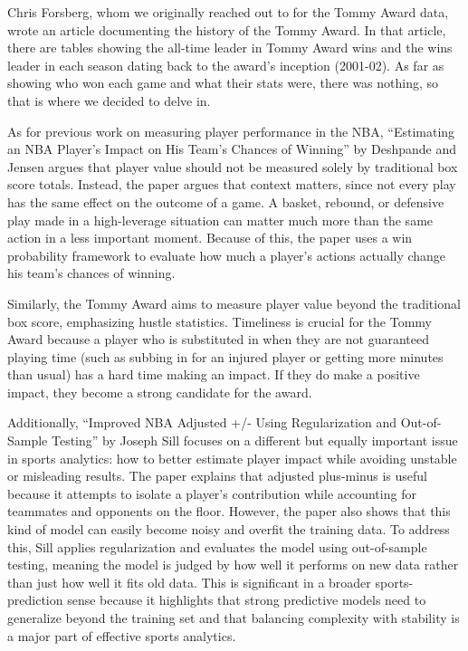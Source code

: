 \documentclass[11pt]{article}
\begin{document}
Chris Forsberg, whom we originally reached out to for the Tommy Award data, wrote an article documenting the history of the Tommy Award. In that article, there are tables showing the all-time leader in Tommy Award wins and the wins leader in each season dating back to the award's inception (2001-02). As far as showing who won each game and what their stats were, there was nothing, so that is where we decided to delve in.

As for previous work on measuring player performance in the NBA, ``Estimating an NBA Player's Impact on His Team's Chances of Winning'' by Deshpande and Jensen argues that player value should not be measured solely by traditional box score totals. Instead, the paper argues that context matters, since not every play has the same effect on the outcome of a game. A basket, rebound, or defensive play made in a high-leverage situation can matter much more than the same action in a less important moment. Because of this, the paper uses a win probability framework to evaluate how much a player's actions actually change his team's chances of winning.

Similarly, the Tommy Award aims to measure player value beyond the traditional box score, emphasizing hustle statistics. Timeliness is crucial for the Tommy Award because a player who is substituted in when they are not guaranteed playing time (such as subbing in for an injured player or getting more minutes than usual) has a hard time making an impact. If they do make a positive impact, they become a strong candidate for the award.

Additionally, ``Improved NBA Adjusted +/- Using Regularization and Out-of-Sample Testing'' by Joseph Sill focuses on a different but equally important issue in sports analytics: how to better estimate player impact while avoiding unstable or misleading results. The paper explains that adjusted plus-minus is useful because it attempts to isolate a player's contribution while accounting for teammates and opponents on the floor. However, the paper also shows that this kind of model can easily become noisy and overfit the training data. To address this, Sill applies regularization and evaluates the model using out-of-sample testing, meaning the model is judged by how well it performs on new data rather than just how well it fits old data. This is significant in a broader sports-prediction sense because it highlights that strong predictive models need to generalize beyond the training set and that balancing complexity with stability is a major part of effective sports analytics.
\end{document}
